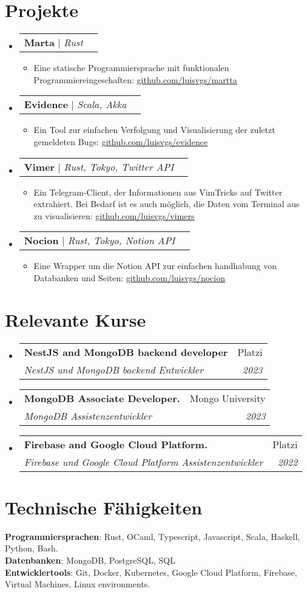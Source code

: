 \documentclass[letterpaper,11pt]{article}
\makeatletter
\newcommand{\resumeItem}[1]{
  \item\small{
    {#1 \vspace{-2pt}}
  }
}
\newcommand{\resumeSubheading}[4]{
  \vspace{-2pt}\item
    \begin{tabular*}{0.97\textwidth}[t]{l@{\extracolsep{\fill}}r}
      \textbf{#1} & #2 \\
      \textit{\small#3} & \textit{\small #4} \\
    \end{tabular*}\vspace{-7pt}
}
\newcommand{\resumeProjectHeading}[2]{
    \item
    \begin{tabular*}{0.97\textwidth}{l@{\extracolsep{\fill}}r}
      \small#1 & #2 \\
    \end{tabular*}\vspace{-7pt}
}
\newcommand{\resumeSubHeadingListStart}{\begin{itemize}[leftmargin=0.15in, label={}]}
\newcommand{\resumeSubHeadingListEnd}{\end{itemize}}
\newcommand{\resumeItemListStart}{\begin{itemize}}
\newcommand{\resumeItemListEnd}{\end{itemize}\vspace{-5pt}}
\makeatother
\begin{document}
\section{Projekte}
    \resumeSubHeadingListStart
      \resumeProjectHeading
 {\textbf{Marta} $|$ \emph{Rust}}{}
          \resumeItemListStart
            \resumeItem{Eine statische Programmiersprache mit funktionalen Programmiereingeschaften: \href{https://github.com/luisvgs/martta}{\underline{github.com/luisvgs/martta}}}
    \resumeItemListEnd
    \resumeProjectHeading
 {\textbf{Evidence} $|$ \emph{Scala, Akka}}{}
          \resumeItemListStart
            \resumeItem{Ein Tool zur einfachen Verfolgung und Visualisierung der zuletzt gemeldeten Bugs: \href{https://github.com/luisvgs/evidence}{\underline{github.com/luisvgs/evidence}}}
    \resumeItemListEnd
    \resumeProjectHeading
{\textbf{Vimer} $|$ \emph{Rust, Tokyo, Twitter API}}{}
          \resumeItemListStart
            \resumeItem{Ein Telegram-Client, der Informationen aus VimTricks auf Twitter extrahiert. Bei Bedarf ist es auch möglich, die Daten vom Terminal aus zu visualisieren:
        \href{https://github.com/luisvgs/vimers}{\underline{github.com/luisvgs/vimers}}}
    \resumeItemListEnd
    \resumeProjectHeading
{\textbf{Nocion} $|$ \emph{Rust, Tokyo, Notion API}}{}
          \resumeItemListStart
          \resumeItem{Eine Wrapper um die Notion API zur einfachen handhabung von Databanken und Seiten:     \href{https://github.com/luisvgs/nocion}{\underline{github.com/luisvgs/nocion}}}
    \resumeItemListEnd
    \resumeSubHeadingListEnd

\section{Relevante Kurse}
  \resumeSubHeadingListStart
    \resumeSubheading
      {NestJS and MongoDB backend developer}{\footnotesize Platzi}
      {\footnotesize \upshape NestJS und MongoDB backend Entwickler}{2023}
    \resumeSubheading
      {MongoDB Associate Developer.}{\footnotesize Mongo University}
      {\footnotesize \upshape MongoDB Assistenzentwickler}{2023}
    \resumeSubheading
      {Firebase and Google Cloud Platform.}{\footnotesize Platzi}
      {\footnotesize \upshape Firebase und Google Cloud Platform Assistenzentwickler}{2022}
  \resumeSubHeadingListEnd

\section{Technische Fähigkeiten}
\begin{itemize}[leftmargin=0.15in, label={}]
   \small{\item{
    \textbf{Programmiersprachen}{: Rust, OCaml, Typescript, Javascript, Scala, Haskell, Python, Bash.} \\
    \textbf{Datenbanken}{: MongoDB, PostgreSQL, SQL} \\
    \textbf{Entwicklertools}{: Git, Docker, Kubernetes, Google Cloud Platform, Firebase, Virtual Machines, Linux environments.} \\
   }}
\end{itemize}
\end{document}
